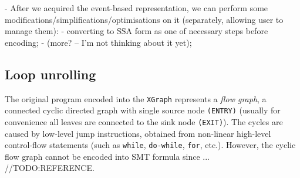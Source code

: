 - After we acquired the event-based representation, we can perform some modifications/simplifications/optimisations on it (separately, allowing user to manage them):
        - converting to SSA form as one of necessary steps before encoding;
        - (more? -- I'm not thinking about it yet);
        
\subsection{Loop unrolling}
\label{ch:impl:x2y:unrolling}

The original program encoded into the \texttt{XGraph} represents a \textit{flow graph}, a connected cyclic directed graph with single source node \texttt{(ENTRY)} (usually for convenience all leaves are connected to the sink node \texttt{(EXIT)}). The cycles are caused by low-level jump instructions, obtained from non-linear high-level control-flow statements (such as \texttt{while}, \texttt{do-while}, \texttt{for}, etc.). However, the cyclic flow graph cannot be encoded into SMT formula since ...
//TODO:REFERENCE.%



